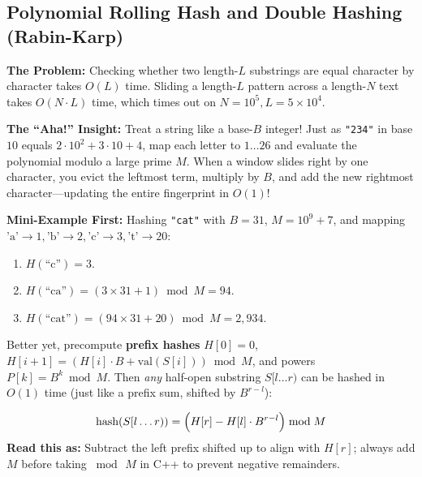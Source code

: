\documentclass[11pt,a4paper]{article}
\theoremstyle{definition}
\newcommand{\painbeat}{\textbf{\color{accentamber}The Problem:} }
\newcommand{\ahabeat}{\textbf{\color{accentteal}The ``Aha!'' Insight:} }
\newcommand{\examplebeat}{\textbf{\color{primaryblue}Mini-Example First:} }
\begin{document}
\subsection{Polynomial Rolling Hash and Double Hashing (Rabin-Karp)}

\painbeat Checking whether two length-$L$ substrings are equal character by character takes $O(L)$ time. Sliding a length-$L$ pattern across a length-$N$ text takes $O(N \cdot L)$ time, which times out on $N = 10^5, L = 5 \times 10^4$.

\ahabeat Treat a string like a base-$B$ integer! Just as \texttt{"234"} in base $10$ equals $2 \cdot 10^2 + 3 \cdot 10 + 4$, map each letter to $1 \dots 26$ and evaluate the polynomial modulo a large prime $M$. When a window slides right by one character, you evict the leftmost term, multiply by $B$, and add the new rightmost character---updating the entire fingerprint in $O(1)$!

\examplebeat Hashing \texttt{"cat"} with $B = 31$, $M = 10^9 + 7$, and mapping $\text{'a'} \to 1, \text{'b'} \to 2, \text{'c'} \to 3, \text{'t'} \to 20$:
\begin{enumerate}
    \item $H(\text{``c''}) = 3$.
    \item $H(\text{``ca''}) = (3 \times 31 + 1) \bmod M = 94$.
    \item $H(\text{``cat''}) = (94 \times 31 + 20) \bmod M = 2{,}934$.
\end{enumerate}

Better yet, precompute \textbf{prefix hashes} $H[0] = 0$, $H[i + 1] = (H[i] \cdot B + \text{val}(S[i])) \bmod M$, and powers $P[k] = B^k \bmod M$. Then \emph{any} half-open substring $S[l \dots r)$ can be hashed in $O(1)$ time (just like a prefix sum, shifted by $B^{r - l}$):

\begin{formulabox}[O(1) Prefix Rolling Hash Query for $S[l \dots r)$]
\[
    \text{hash}(S[l \dots r)) = \Bigl(H[r] - H[l] \cdot B^{r - l}\Bigr) \bmod M
\]
\textbf{Read this as:} Subtract the left prefix shifted up to align with $H[r]$; always add $M$ before taking $\bmod\, M$ in C++ to prevent negative remainders.
\end{formulabox}
\end{document}
